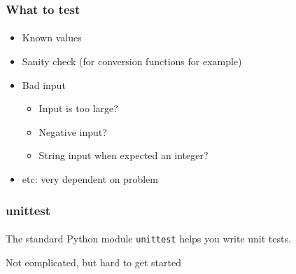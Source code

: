 \begin{frame}\frametitle{What to test}
    \framesubtitle{}

    \begin{itemize}
        \item Known values
        \item Sanity check (for conversion functions for example)
        \item Bad input
        \begin{itemize}
            \item Input is too large?
            \item Negative input?
            \item String input when expected an integer?
        \end{itemize}
        \item etc: very dependent on problem
    \end{itemize}

\end{frame}

\begin{frame}\frametitle{unittest}
    \framesubtitle{}

    The standard Python module \texttt{unittest} helps you write unit tests.



    Not complicated, but hard to get started

\end{frame}



